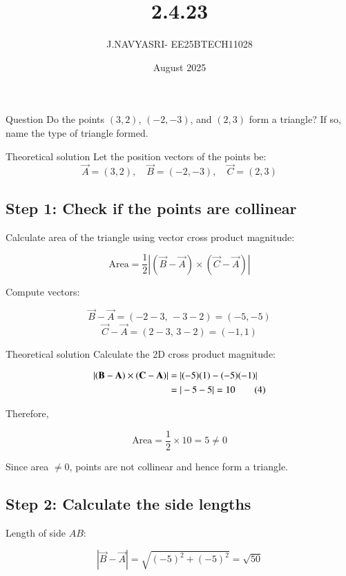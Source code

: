 \documentclass{beamer}
\title %
{2.4.23}
\date{August  2025}
\author %
{J.NAVYASRI- EE25BTECH11028}
\begin{document}
\frame{\titlepage}
\begin{frame}{Question}
Do the points \( (3, 2) \), \( (-2, -3) \), and \( (2, 3) \) form a triangle? If so, name the type of triangle formed.
\end{frame}

\begin{frame}{Theoretical solution}
Let the position vectors of the points be:
\[
\vec{A} = (3, 2), \quad \vec{B} = (-2, -3), \quad \vec{C} = (2, 3)
\]

\subsection*{Step 1: Check if the points are collinear}

Calculate area of the triangle using vector cross product magnitude:

\begin{equation}
\text{Area} = \frac{1}{2} \left| (\vec{B} - \vec{A}) \times (\vec{C} - \vec{A}) \right| \tag{1}
\end{equation}

Compute vectors:

\[
\vec{B} - \vec{A} = (-2 - 3,\, -3 - 2) = (-5, -5) \tag{2}
\]
\[
\vec{C} - \vec{A} = (2 - 3,\, 3 - 2) = (-1, 1) \tag{3}
\]

\end{frame}

\begin{frame}{Theoretical solution}
Calculate the 2D cross product magnitude:

\begin{align}
|(\vec{B} - \vec{A}) \times (\vec{C} - \vec{A})| &= |(-5)(1) - (-5)(-1)| \notag \\
&= |-5 - 5| = 10 \tag{4}
\end{align}

Therefore,

\[
\text{Area} = \frac{1}{2} \times 10 = 5 \neq 0 \tag{5}
\]

Since area \(\neq 0\), points are not collinear and hence form a triangle.



  \subsection*{Step 2: Calculate the side lengths}

Length of side \(AB\):

\begin{equation}
|\vec{B} - \vec{A}| = \sqrt{(-5)^2 + (-5)^2} = \sqrt{50} \tag{6}
\end{equation}
\end{frame}
\end{document}
